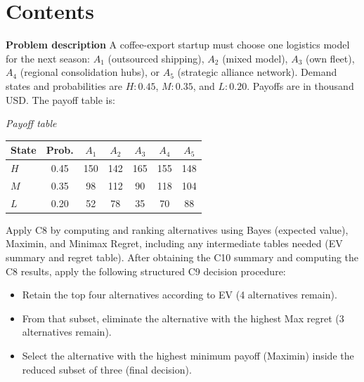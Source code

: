 


\section*{Contents}
\setcounter{tocdepth}{2}
\setcounter{secnumdepth}{1}
\tableofcontents

	
	\begin{ExamProblems}

		\item
		\textbf{Problem description}
		A coffee-export startup must choose one logistics model for the next season: $A_1$ (outsourced shipping), $A_2$ (mixed model), $A_3$ (own fleet), $A_4$ (regional consolidation hubs), or $A_5$ (strategic alliance network).
		Demand states and probabilities are $H:0.45$, $M:0.35$, and $L:0.20$. Payoffs are in thousand USD. The payoff table is:
		
		\begin{center}
			\textit{Payoff table} \\
			\begin{tabular}{l c c c c c c}
				\hline
				State& Prob. & $A_1$ & $A_2$ & $A_3$ & $A_4$ & $A_5$ \\
				\hline
				$H$ & 0.45 & 150 & 142 & 165 & 155 & 148 \\
				$M$ & 0.35 & 98 & 112 & 90 & 118 & 104 \\
				$L$ & 0.20 & 52 & 78 & 35 & 70 & 88 \\
				\hline
			\end{tabular}
		\end{center}
		
		Apply C8 by computing and ranking alternatives using Bayes (expected value), Maximin, and Minimax Regret, including any intermediate tables needed (EV summary and regret table).
		After obtaining the C10 summary and computing the C8 results, apply the following structured C9 decision procedure:
		\begin{itemize}
			\item Retain the top four alternatives according to EV (4 alternatives remain).
			\item From that subset, eliminate the alternative with the highest Max regret (3 alternatives remain).
			\item Select the alternative with the highest minimum payoff (Maximin) inside the reduced subset of three (final decision).
		\end{itemize}
		

\end{ExamProblems}
